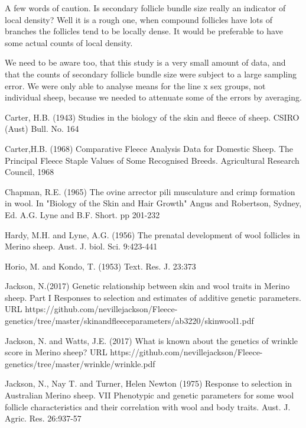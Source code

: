 \documentclass[titlepage]{article}  %
\begin{document}
A few words of caution. Is secondary follicle bundle size really an indicator of local density? Well it is a rough one, when compound follicles have lots of branches the follicles tend to be locally dense. It would be preferable to have some actual counts of local density. 

We need to be aware too, that this study is a very small amount of data, and that the counts of secondary follicle bundle size were subject to a large sampling error. We were only able to analyse means for the line x sex groups, not individual sheep, because we needed to attenuate some of the errors by averaging.


\clearpage

\begin{thebibliography}{99}

Carter, H.B. (1943) Studies in the biology of the skin and fleece of sheep. CSIRO (Aust) Bull. No. 164

Carter,H.B. (1968) Comparative Fleece Analysis Data for Domestic Sheep. The Principal Fleece Staple Values of Some Recognised Breeds. Agricultural Research Council, 1968


Chapman, R.E. (1965) The ovine arrector pili musculature and crimp formation 
    in wool. In "Biology of the Skin and Hair Growth" Angus and Robertson,
    Sydney, Ed. A.G. Lyne and B.F. Short. pp 201-232

Hardy, M.H. and Lyne, A.G. (1956) The prenatal development of wool follicles in Merino sheep. Aust. J. biol. Sci. 9:423-441

Horio, M. and Kondo, T. (1953) Text. Res. J. 23:373

Jackson, N.(2017) Genetic relationship between skin and wool traits in Merino sheep. Part I Responses to selection and estimates of additive genetic parameters. URL https://github.com/nevillejackson/Fleece-genetics/tree/master/skinandfleeceparameters/ab3220/skinwool1.pdf

Jackson, N. and Watts, J.E. (2017) What is known about the genetics of wrinkle score in Merino sheep? URL https://github.com/nevillejackson/Fleece-genetics/tree/master/wrinkle/wrinkle.pdf

Jackson, N., Nay T. and Turner, Helen Newton (1975) Response to selection
    in Australian Merino sheep. VII Phenotypic and genetic parameters for
    some wool follicle characteristics and their correlation with wool and
    body traits. Aust. J. Agric. Res. 26:937-57


\end{thebibliography}
\end{document}
